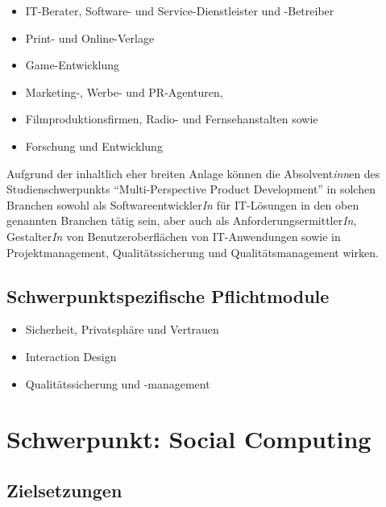 \begin{itemize}
\tightlist
\item
  IT-Berater, Software- und Service-Dienstleister und -Betreiber
\item
  Print- und Online-Verlage
\item
  Game-Entwicklung
\item
  Marketing-, Werbe- und PR-Agenturen,
\item
  Filmproduktionsfirmen, Radio- und Fernsehanstalten sowie
\item
  Forschung und Entwicklung
\end{itemize}

Aufgrund der inhaltlich eher breiten Anlage können die
Absolvent\emph{inn}en des Studienschwerpunkts ``Multi-Perspective
Product Development'' in solchen Branchen sowohl als
Softwareentwickler\emph{In} für IT-Lösungen in den oben genannten
Branchen tätig sein, aber auch als Anforderungsermittler\emph{In},
Gestalter\emph{In} von Benutzeroberflächen von IT-Anwendungen sowie in
Projektmanagement, Qualitätssicherung und Qualitätsmanagement wirken.

\section*{Schwerpunktspezifische
Pflichtmodule\label{/mi-2017/modulbeschreibungen-master/schwerpunkt-multiperspective-product-development}}\label{schwerpunktspezifische-pflichtmodulepathlabelmi-2017modulbeschreibungen-masterschwerpunkt-multiperspective-product-development}

\begin{itemize}
\tightlist
\item
  Sicherheit, Privatsphäre und Vertrauen
\item
  Interaction Design
\item
  Qualitätssicherung und -management
\end{itemize}

\chapter{Schwerpunkt: Social
Computing\label{/mi-2017/modulbeschreibungen-master/schwerpunkt-soziotechnische-systeme}}\label{schwerpunkt-social-computingpathlabelmi-2017modulbeschreibungen-masterschwerpunkt-soziotechnische-systeme}

\section*{Zielsetzungen\label{/mi-2017/modulbeschreibungen-master/schwerpunkt-soziotechnische-systeme}}\label{zielsetzungenpathlabelmi-2017modulbeschreibungen-masterschwerpunkt-soziotechnische-systeme}

